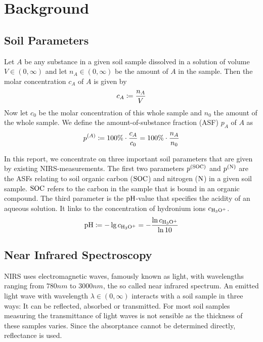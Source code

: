 \section{Background}
\label{sec:background}
	
	\subsection{Soil Parameters}
	\label{ssec:soil-parameters}
	
		Let $A$ be any substance in a given soil sample dissolved in a solution of volume $V\in(0,\infty)$ and let $n_A\in(0,\infty)$ be the amount of $A$ in the sample.
		Then the molar concentration $c_A$ of $A$ is given by
		\[
			c_A \coloneqq \frac{n_A}{V}
		\]
		Now let $c_0$ be the molar concentration of this whole sample and $n_0$ the amount of the whole sample.
		We define the amount-of-substance fraction (ASF) $p_A$ of $A$ as 
		\[
			p^{(A)} \coloneqq 100\%\cdot\frac{c_A}{c_0} = 100\% \cdot\frac{n_A}{n_0}
		\]

		In this report, we concentrate on three important soil parameters that are given by existing NIRS-measurements. %
		The first two parameters $p^{\mathrm{(SOC)}}$ and $p^{\mathrm{(N)}}$ are the ASFs relating to soil organic carbon ($\mathrm{SOC}$) and nitrogen ($\mathrm{N}$) in a given soil sample.
		$\mathrm{SOC}$ refers to the carbon in the sample that is bound in an organic compound.
		The third parameter is the $\mathrm{pH}$-value that specifies the acidity of an aqueous solution.
		It links to the concentration of hydronium ions $c_{\mathrm{H_3O^+}}$.
		\[
			\mathrm{pH} \coloneqq -\lg c_{\mathrm{H_3O^+}} = -\frac{\ln c_{\mathrm{H_3O^+}}}{\ln 10}
		\]
	

	\subsection{Near Infrared Spectroscopy}
	\label{ssec:nirs}
	
		NIRS uses electromagnetic waves, %
		 famously known as light, with wavelengths ranging from $780\unit{nm}$ to $3000\unit{nm}$, the so called near infrared spectrum.
		An emitted light wave with wavelength $\lambda \in (0,\infty)$ interacts with a soil sample in three ways:
		It can be reflected, absorbed or transmitted.
		For most soil samples measuring the transmittance of light waves is not sensible as the thickness of these samples varies.
		Since the absorptance cannot be determined directly, reflectance is used.

